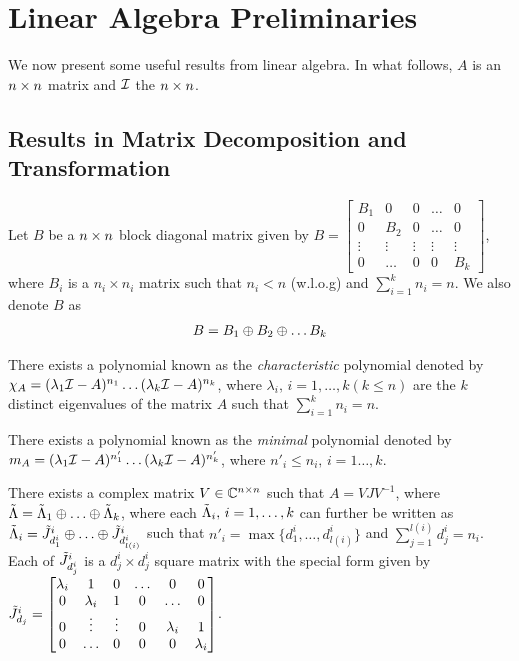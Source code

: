 \section{Linear Algebra Preliminaries}


We now present some useful results from linear algebra. In what follows, $A$ is an $n\times n$ matrix and $\mathcal{I}$ the $n\times n$.
\subsection{Results in Matrix Decomposition and Transformation}
Let $B$ be a $n\times n$ block diagonal matrix given by $B=\begin{bmatrix} B_1 &0 &0 &\ldots &0 \\ 0 &B_2 &0 &\ldots &0  \\ \vdots &\vdots &\vdots &\vdots &\vdots \\ 0 &\ldots &0 &0 &B_k \end{bmatrix}$, where $B_i$ is a $n_i \times n_i$ matrix such that $n_i<n$ (w.l.o.g) and $\sum_{i=1}^k n_i=n$. We also denote $B$ as
\begin{align*}
B=B_1 \oplus B_2 \oplus \ldots B_k
\end{align*}
\begin{lemma}
There exists a polynomial known as the \emph{characteristic} polynomial denoted by $\chi_A=(\lambda_1 \mathcal{I}-A)^{n_1}\ldots(\lambda_{k} \mathcal{I}-A)^{n_k}$, where $\lambda_i,\,i=1,\ldots,k (k\leq n)$ are the $k$ distinct eigenvalues of the matrix $A$ such that $\sum_{i=1}^k n_i=n$.
\end{lemma}
\begin{lemma}
There exists a polynomial known as the \emph{minimal} polynomial denoted by $m_A=(\lambda_1 \mathcal{I}-A)^{n'_1}\ldots(\lambda_k \mathcal{I}-A)^{n'_k}$, where $n'_i\leq n_i,\,i=1\ldots,k$.
\end{lemma}
\begin{lemma}
There exists a complex matrix $V\in \mathbb{C}^{n\times n}$ such that $A=VJ V^{-1}$, where
$\tilde{\Lambda}=\tilde{\Lambda}_1\oplus\ldots\oplus\tilde{\Lambda}_k$, where each $\tilde{\Lambda}_i,\,i=1,\ldots,k$ can further be written as $\tilde{\Lambda}_i= {\tilde{J}}^i_{d^i_1}\oplus \ldots \oplus {\tilde{J}}^i_{d^i_{l(i)}}$
such that  $n'_i=\max\{d^i_1,\ldots, d^i_{l(i)} \}$ and $\sum_{j=1}^{l(i)} d^i_j =n_i$. Each of ${\tilde{J}}^i_{d^i_j}$ is a $d^i_j\times d^i_j$ square matrix with the special form given by
${\tilde{J}}^i_{d_j}=\begin{bmatrix} \lambda_i &1 &0 &\ldots &0 &0\\ 0 &\lambda_i &1 &0 &\ldots &0 \\ 0 &\vdots &\vdots &0 &\lambda_i &1 \\ 0 &\ldots &0 &0 &0 &\lambda_i \end{bmatrix}$.
\end{lemma}


